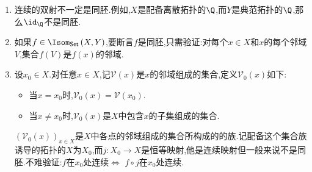\begin{remark}{}{}
	\begin{enumerate}
		\item 连续的双射不一定是同胚.例如,$X$是配备离散拓扑的$\Q$,而$Y$是典范拓扑的$\Q$,那么$\id_{\Q}$不是同胚.
		\item 如果$f\in\Isom_{\mathsf{Set}}\left(X,Y\right)$,要断言$f$是同胚,只需验证:对每个$x\in X$和$x$的每个邻域$V$,集合$f\left(V\right)$是$f\left(x\right)$的邻域.
		\item 设$x_{0}\in X$.对任意$x\in X$,记$\mathcal{V}\left(x\right)$是$x$的邻域组成的集合,定义$\mathcal{V}_{0}\left(x\right)$如下:
		\begin{itemize}
			\item 当$x=x_{0}$时,$\mathcal{V}_{0}\left(x\right)=\mathcal{V}\left(x_{0}\right)$.
			\item 当$x\neq x_{0}$时,$\mathcal{V}_{0}\left(x\right)$是$X$中包含$x$的子集组成的集合.
		\end{itemize}
		$\left(\mathcal{V}_{0}\left(x\right)\right)_{x\in X}$是$X$中各点的邻域组成的集合所构成的的族.记配备这个集合族诱导的拓扑的$X$为$X_{0}$,而$j:X_{0}\to X$是恒等映射,他是连续映射但一般来说不是同胚.不难验证:$f$在$x_{0}$处连续$\iff$ $f\circ j$在$x_{0}$处连续.
	\end{enumerate}
\end{remark}













